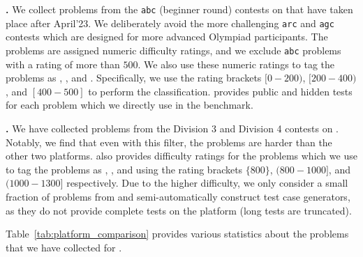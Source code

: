 \vspace{2pt}
\noindent \textbf{\atcoder{}.}
We collect problems from the \texttt{abc} (beginner round) contests on \atcoder{} that have taken place after April'23. 
We deliberately avoid the more challenging \texttt{arc} and \texttt{agc} contests which are designed for more advanced Olympiad participants.
The problems are assigned numeric difficulty ratings, and we exclude \texttt{abc} problems with a rating of more than $500$.
We also use these numeric ratings to tag the problems as \easy{}, \medium{}, and \hard{}.
Specifically, we use the rating brackets $[0-200)$, $[200-400)$, and $[400-500]$ to perform the classification.
\atcoder{} provides public and hidden tests for each problem which we directly use in the benchmark.

\vspace{2pt}
\noindent \textbf{\codeforces{}.}
We have collected problems from the Division 3 and Division 4 contests on \codeforces{}.
Notably, we find that even with this filter, the problems are harder than the other two platforms.
\codeforces{} also provides difficulty ratings for the problems which we use to tag the problems as \easy{}, \medium{}, and \hard{} using the rating brackets $\{800\}$, $(800-1000]$, and $(1000-1300]$ respectively.
Due to the higher difficulty, we only consider a small fraction of problems from \codeforces{} and semi-automatically construct test case generators, as they do not provide complete tests on the platform (long tests are truncated).

\noindent Table~\ref*{tab:platform_comparison} provides various statistics about the problems that we have collected for \livecodebench{}. 


